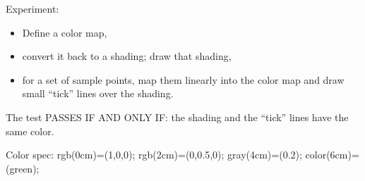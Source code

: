 \documentclass{article}
\begin{document}
Experiment:
\begin{itemize}
	\item Define a color map,
	\item convert it back to a shading; draw that shading,
	\item for a set of sample points, map them linearly into the color map and draw small ``tick'' lines over the shading.
\end{itemize}

The test PASSES IF AND ONLY IF: the shading and the ``tick'' lines have the same color.

Color spec: {rgb(0cm)=(1,0,0); rgb(2cm)=(0,0.5,0);  gray(4cm)=(0.2);  color(6cm)=(green); }


\def\LENGTH{300}

\pgfplotscolormaptoshadingspec{my map}{\LENGTH pt}\temp
\def\tempb{\pgfdeclarehorizontalshading{myshadingA}{1cm}}
\expandafter\tempb\expandafter{\temp}
\end{document}

